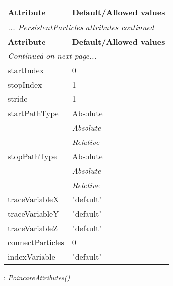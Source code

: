 \documentclass[10pt,a4paper]{report}
\begin{document}
\begin{longtable}{ll}
{\bf Attribute} & {\bf Default/Allowed values} \\
\hline \hline
\endfirsthead
\multicolumn{2}{l}{{\it ... PersistentParticles attributes continued}} \\
{\bf Attribute} & {\bf Default/Allowed values} \\
\hline \hline
\endhead
\hline
\multicolumn{2}{l}{{\it Continued on next page...}} \\
\endfoot
\hline
\endlastfoot

startIndex  &  0 \\
stopIndex  &  1 \\
stride  &  1 \\
startPathType  &  Absolute   \\
 & {\it  Absolute} \\
 & {\it  Relative} \\
stopPathType  &  Absolute   \\
 & {\it  Absolute} \\
 & {\it  Relative} \\
traceVariableX  &  "default" \\
traceVariableY  &  "default" \\
traceVariableZ  &  "default" \\
connectParticles  &  0 \\
indexVariable  &  "default" \\
\end{longtable}

\newpage

{}
: {\it PoincareAttributes() }\\[-3mm]
\end{document}
